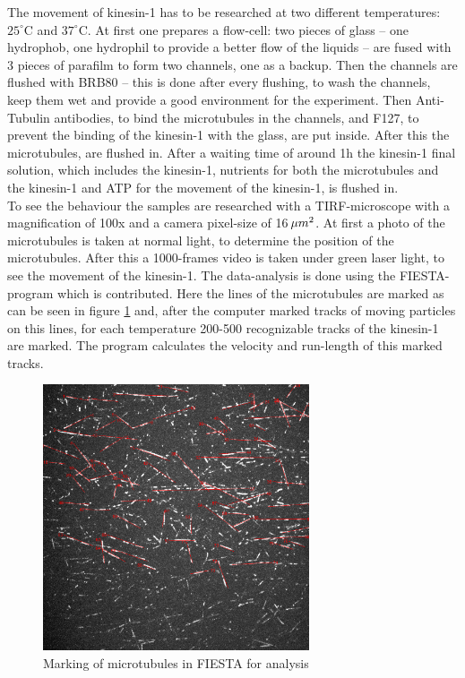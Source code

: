 \documentclass[english, %
parskip=full, %
bibliography=totoc, %
]{scrartcl}
\begin{document}
The movement of kinesin-1 has to be researched at two different temperatures: $25^\circ\text{C}$ and $37^\circ\text{C}$.
At first one prepares a flow-cell: two pieces of glass – one hydrophob, one hydrophil to provide a better flow of the liquids – are fused with 3 pieces of parafilm to form two channels, one as a backup. Then the channels are flushed with BRB80 – this is done after every flushing, to wash the channels, keep them wet and provide a good environment for the experiment. Then Anti-Tubulin antibodies, to bind the microtubules in the channels, and F127, to prevent the binding of the kinesin-1 with the glass, are put inside. After this the microtubules, are flushed in. After a waiting time of around 1h the kinesin-1 final solution, which includes the kinesin-1, nutrients for both the microtubules and the kinesin-1 and ATP for the movement of the kinesin-1, is flushed in.\\
To see the behaviour the samples are researched with a TIRF-microscope with a magnification of 100x and a camera pixel-size of 16\,$\mu m\textsuperscript{2}$. At first a photo of the microtubules is taken at normal light, to determine the position of the microtubules. After this a 1000-frames video is taken under green laser light, to see the movement of the kinesin-1. The data-analysis is done using the FIESTA-program which is contributed. Here the lines of the microtubules are marked as can be seen in figure \ref{fig:marking} and, after the computer marked tracks of moving particles on this lines, for each temperature 200-500 recognizable tracks of the kinesin-1 are marked. The program calculates the velocity and run-length of this marked tracks.

\begin{figure}[!ht] 
  \centering
     \includegraphics[width=0.7\textwidth]{kinesin_marking}
  \caption{Marking of microtubules in FIESTA for analysis}
  \label{fig:marking}
\end{figure}
\end{document}
